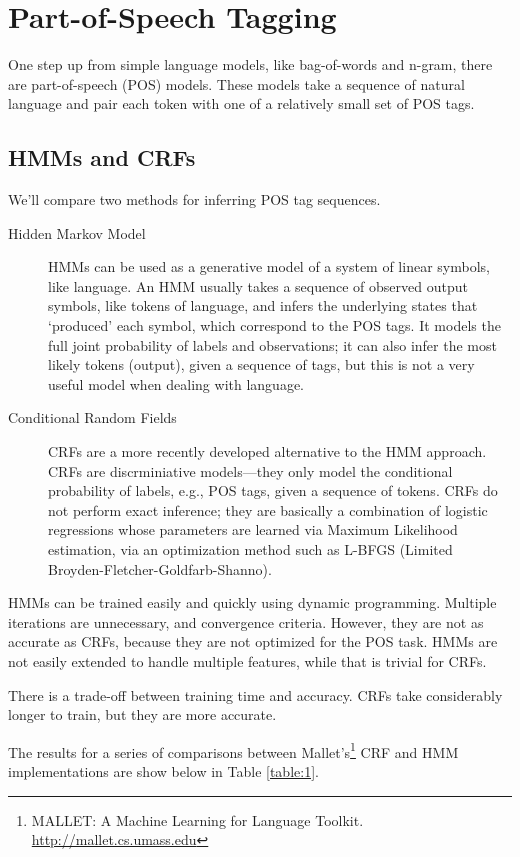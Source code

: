 \documentclass[10pt]{article}\usepackage{graphicx, color}
\begin{document}
\section{Part-of-Speech Tagging}

One step up from simple language models, like bag-of-words and n-gram, there are part-of-speech (POS) models.
These models take a sequence of natural language and pair each token with one of a relatively small set of POS tags.

\subsection{HMMs and CRFs}

We'll compare two methods for inferring POS tag sequences.

\begin{description}
  \item[Hidden Markov Model] HMMs can be used as a generative model of a system of linear symbols, like language. An HMM usually takes a sequence of observed output symbols, like tokens of language, and infers the underlying states that `produced' each symbol, which correspond to the POS tags. It models the full joint probability of labels and observations; it can also infer the most likely tokens (output), given a sequence of tags, but this is not a very useful model when dealing with language.
  \item[Conditional Random Fields] CRFs are a more recently developed alternative to the HMM approach. CRFs are discrminiative models---they only model the conditional probability of labels, e.g., POS tags, given a sequence of tokens. CRFs do not perform exact inference; they are basically a combination of logistic regressions whose parameters are learned via Maximum Likelihood estimation, via an optimization method such as L-BFGS (Limited Broyden-Fletcher-Goldfarb-Shanno).
\end{description}

\noindent
HMMs can be trained easily and quickly using dynamic programming. Multiple iterations are unnecessary, and convergence criteria. However, they are not as accurate as CRFs, because they are not optimized for the POS task. HMMs are not easily extended to handle multiple features, while that is trivial for CRFs.

There is a trade-off between training time and accuracy. CRFs take considerably longer to train, but they are more accurate.

The results for a series of comparisons between Mallet's\footnote{MALLET: A Machine Learning for Language Toolkit. \url{http://mallet.cs.umass.edu}} CRF and HMM implementations are show below in Table \ref{table:1}.
\end{document}
